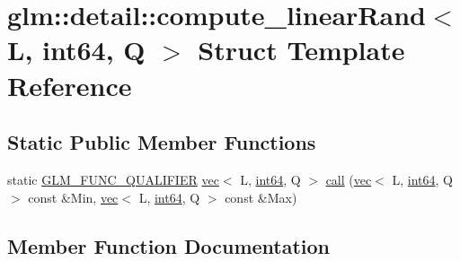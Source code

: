 \hypertarget{structglm_1_1detail_1_1compute__linear_rand_3_01_l_00_01int64_00_01_q_01_4}{}\section{glm\+:\+:detail\+:\+:compute\+\_\+linear\+Rand$<$ L, int64, Q $>$ Struct Template Reference}
\label{structglm_1_1detail_1_1compute__linear_rand_3_01_l_00_01int64_00_01_q_01_4}
\subsection*{Static Public Member Functions}
\begin{DoxyCompactItemize}
\item 
static \mbox{\hyperlink{setup_8hpp_a33fdea6f91c5f834105f7415e2a64407}{G\+L\+M\+\_\+\+F\+U\+N\+C\+\_\+\+Q\+U\+A\+L\+I\+F\+I\+ER}} \mbox{\hyperlink{structglm_1_1vec}{vec}}$<$ L, \mbox{\hyperlink{namespaceglm_1_1detail_a5b1c3227ec636c24a0676746381adfc8}{int64}}, Q $>$ \mbox{\hyperlink{structglm_1_1detail_1_1compute__linear_rand_3_01_l_00_01int64_00_01_q_01_4_a228cd2fef53b8af89955bc01dfde047a}{call}} (\mbox{\hyperlink{structglm_1_1vec}{vec}}$<$ L, \mbox{\hyperlink{namespaceglm_1_1detail_a5b1c3227ec636c24a0676746381adfc8}{int64}}, Q $>$ const \&Min, \mbox{\hyperlink{structglm_1_1vec}{vec}}$<$ L, \mbox{\hyperlink{namespaceglm_1_1detail_a5b1c3227ec636c24a0676746381adfc8}{int64}}, Q $>$ const \&Max)
\end{DoxyCompactItemize}


\subsection{Member Function Documentation}
\mbox{\label{structglm_1_1detail_1_1compute__linear_rand_3_01_l_00_01int64_00_01_q_01_4_a228cd2fef53b8af89955bc01dfde047a}} 
